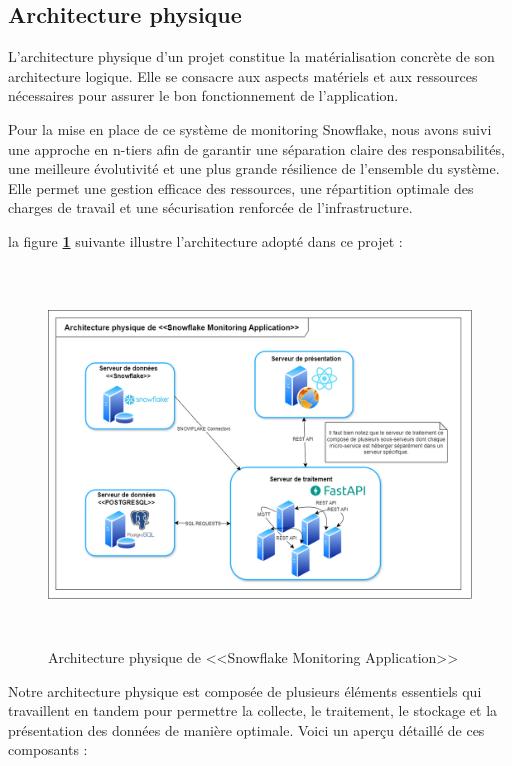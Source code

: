 \subsection{Architecture physique}
    \par L'architecture physique d'un projet constitue la matérialisation concrète de son architecture logique. Elle se consacre aux aspects matériels et aux ressources nécessaires pour assurer le bon fonctionnement de l'application\cite{archi_phy}.
    \par Pour la mise en place de ce système de monitoring Snowflake, nous avons suivi une approche en n-tiers afin de garantir une séparation claire des responsabilités, 
    une meilleure évolutivité et une plus grande résilience de l'ensemble du système. Elle permet une gestion efficace des ressources, une répartition optimale des charges de travail et une sécurisation renforcée de l'infrastructure. 
    \par la figure \textbf{\ref{fig:arch_phy}} suivante illustre l'architecture adopté dans ce projet : 
        \begin{figure}[H]
        \centering
        \includegraphics[width = 17cm , height=10cm]{img/techno/archi_phy.png}
        \caption{Architecture physique de <<Snowflake Monitoring Application>>}
        \label{fig:arch_phy}
        \end{figure}
        \par Notre architecture physique est composée de plusieurs éléments essentiels qui travaillent en tandem pour permettre la collecte, le traitement, le stockage et la présentation des données de manière optimale. Voici un aperçu détaillé de ces composants :
